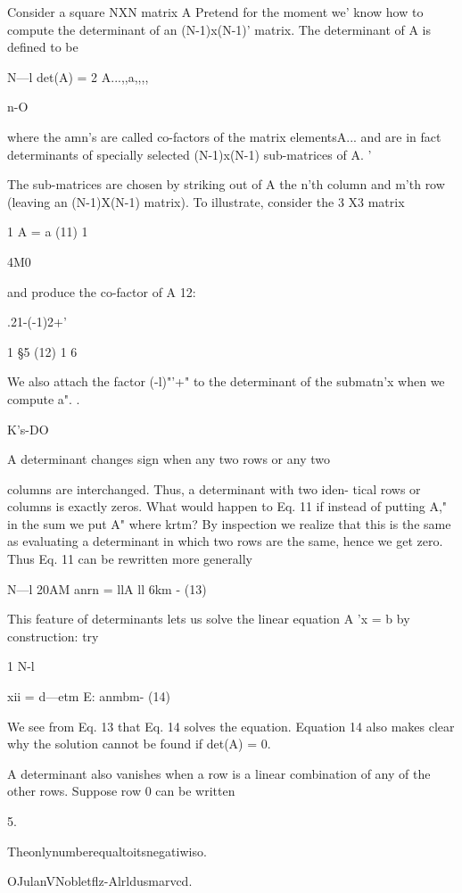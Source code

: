 {Consider a square NXN matrix A Pretend for the moment we'
know how to compute the determinant of an (N-1)x(N-1)'
matrix. The determinant of A is defined to be

N—l
det(A) = 2 A...,,a,,,,

n-O

where the amn's are called co-factors of the matrix elementsA...
and are in fact determinants of specially selected (N-1)x(N-1)
sub-matrices of A. '

The sub-matrices are chosen by striking out of A the n'th column
and m'th row (leaving an (N-1)X(N-1) matrix). To illustrate,
consider the 3 X3 matrix

1
A = a (11)
1

4M0

and produce the co-factor of A 12:

 

.21-(-1)2+'

1 \S 5 (12)
1 6

We also attach the factor (-l)"'+" to the determinant of the
submatn'x when we compute a". .

K's-DO

A determinant changes sign when any two rows or any two

columns are interchanged. Thus, a determinant with two iden-
tical rows or columns is exactly zeros. What would happen to
Eq. 11 if instead of putting A," in the sum we put A" where
krtm? By inspection we realize that this is the same as evaluating
a determinant in which two rows are the same, hence we get zero.
Thus Eq. 11 can be rewritten more generally

N—l
20AM anrn = llA ll 6km - (13)

This feature of determinants lets us solve the linear equation
A 'x = b by construction: try

1 N-l

xii = d—etm E: anmbm- (14)

We see from Eq. 13 that Eq. 14 solves the equation. Equation 14
also makes clear why the solution cannot be found if det(A) = 0.

A determinant also vanishes when a row is a linear combination
of any of the other rows. Suppose row 0 can be written

 

5.

Theonlynumberequaltoitsnegatiwiso.

OJulanVNobletflz-Alrldusmarvcd.

}
